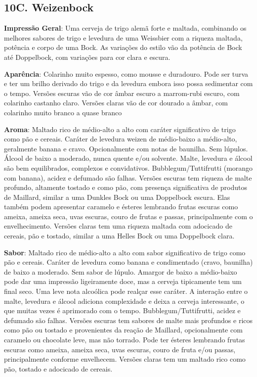 \subsection*{10C. Weizenbock}

\textbf{Impressão Geral}: Uma cerveja de trigo alemã forte e maltada, combinando os melhores sabores de trigo e levedura de uma Weissbier com a riqueza maltada, potência e corpo de uma Bock. As variações do estilo vão da potência de Bock até Doppelbock, com variações para cor clara e escura.

\textbf{Aparência}: Colarinho muito espesso, como mousse e duradouro. Pode ser turva e ter um brilho derivado do trigo e da levedura embora isso possa sedimentar com o tempo.
Versões escuras vão de cor âmbar escuro a marrom-rubi escuro, com colarinho castanho claro.
Versões claras vão de cor dourado a âmbar, com colarinho muito branco a quase branco

\textbf{Aroma}: Maltado rico de médio-alto a alto com caráter significativo de trigo como pão e cereais. Caráter de levedura weizen de médio-baixo a médio-alto, geralmente banana e cravo. Opcionalmente com notas de baunilha. Sem lúpulos. Álcool de baixo a moderado, nunca quente e/ou solvente. Malte, levedura e álcool são bem equilibrados, complexos e convidativos. Bubblegum/Tuttifrutti (morango com banana), acidez e defumado são falhas.
Versões escuras tem riqueza de malte profundo, altamente tostado e como pão, com presença significativa de produtos de Maillard, similar a uma Dunkles Bock ou uma Doppelbock escura. Elas também podem apresentar caramelo e ésteres lembrando frutas escuras como ameixa, ameixa seca, uvas escuras, couro de frutas e passas, principalmente com o envelhecimento.
Versões claras tem uma riqueza maltada com adocicado de cereais, pão e tostado, similar a uma Helles Bock ou uma Doppelbock clara.

\textbf{Sabor}: Maltado rico de médio-alto a alto com sabor significativo de trigo como pão e cereais. Caráter de levedura como banana e condimentado (cravo, baunilha) de baixo a moderado. Sem sabor de lúpulo. Amargor de baixo a médio-baixo pode dar uma impressão ligeiramente doce, mas a cerveja tipicamente tem um final seco. Uma leve nota alcoólica pode realçar esse caráter. A interação entre o malte, levedura e álcool adiciona complexidade e deixa a cerveja interessante, o que muitas vezes é aprimorado com o tempo. Bubblegum/Tuttifrutti, acidez e defumado são falhas.
Versões escuras tem sabores de malte mais profundos e ricos como pão ou tostado e provenientes da reação de Maillard, opcionalmente com caramelo ou chocolate leve, mas não torrado. Pode ter ésteres lembrando frutas escuras como ameixa, ameixa seca, uvas escuras, couro de fruta e/ou passas, principalmente conforme envelhecem.
Versões claras tem um maltado rico como pão, tostado e adocicado de cereais.

